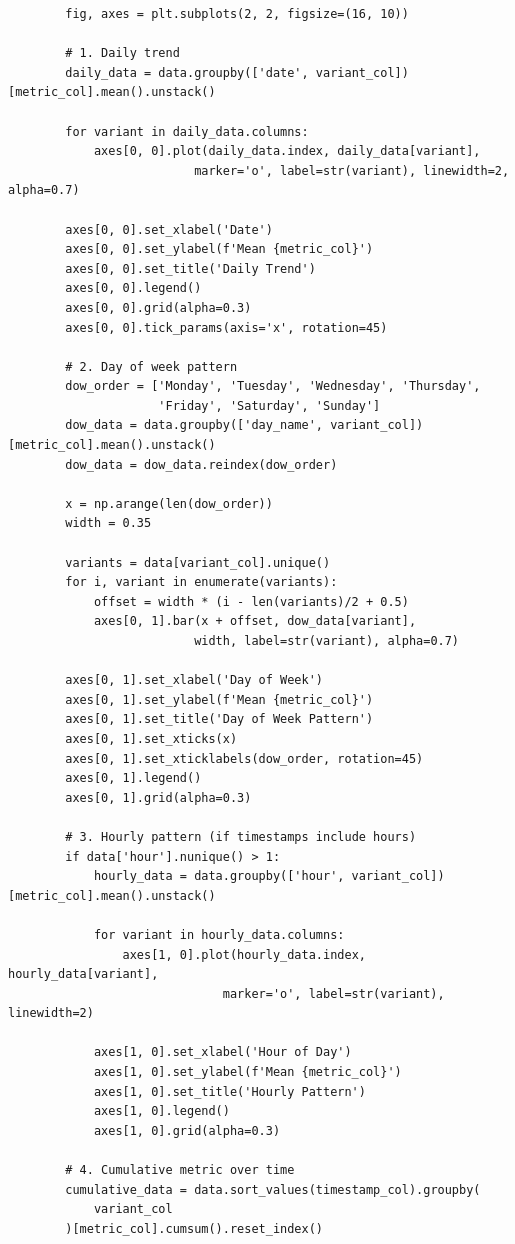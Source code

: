 \begin{lstlisting}
        fig, axes = plt.subplots(2, 2, figsize=(16, 10))

        # 1. Daily trend
        daily_data = data.groupby(['date', variant_col])[metric_col].mean().unstack()

        for variant in daily_data.columns:
            axes[0, 0].plot(daily_data.index, daily_data[variant],
                          marker='o', label=str(variant), linewidth=2, alpha=0.7)

        axes[0, 0].set_xlabel('Date')
        axes[0, 0].set_ylabel(f'Mean {metric_col}')
        axes[0, 0].set_title('Daily Trend')
        axes[0, 0].legend()
        axes[0, 0].grid(alpha=0.3)
        axes[0, 0].tick_params(axis='x', rotation=45)

        # 2. Day of week pattern
        dow_order = ['Monday', 'Tuesday', 'Wednesday', 'Thursday',
                     'Friday', 'Saturday', 'Sunday']
        dow_data = data.groupby(['day_name', variant_col])[metric_col].mean().unstack()
        dow_data = dow_data.reindex(dow_order)

        x = np.arange(len(dow_order))
        width = 0.35

        variants = data[variant_col].unique()
        for i, variant in enumerate(variants):
            offset = width * (i - len(variants)/2 + 0.5)
            axes[0, 1].bar(x + offset, dow_data[variant],
                          width, label=str(variant), alpha=0.7)

        axes[0, 1].set_xlabel('Day of Week')
        axes[0, 1].set_ylabel(f'Mean {metric_col}')
        axes[0, 1].set_title('Day of Week Pattern')
        axes[0, 1].set_xticks(x)
        axes[0, 1].set_xticklabels(dow_order, rotation=45)
        axes[0, 1].legend()
        axes[0, 1].grid(alpha=0.3)

        # 3. Hourly pattern (if timestamps include hours)
        if data['hour'].nunique() > 1:
            hourly_data = data.groupby(['hour', variant_col])[metric_col].mean().unstack()

            for variant in hourly_data.columns:
                axes[1, 0].plot(hourly_data.index, hourly_data[variant],
                              marker='o', label=str(variant), linewidth=2)

            axes[1, 0].set_xlabel('Hour of Day')
            axes[1, 0].set_ylabel(f'Mean {metric_col}')
            axes[1, 0].set_title('Hourly Pattern')
            axes[1, 0].legend()
            axes[1, 0].grid(alpha=0.3)

        # 4. Cumulative metric over time
        cumulative_data = data.sort_values(timestamp_col).groupby(
            variant_col
        )[metric_col].cumsum().reset_index()


\end{lstlisting}
